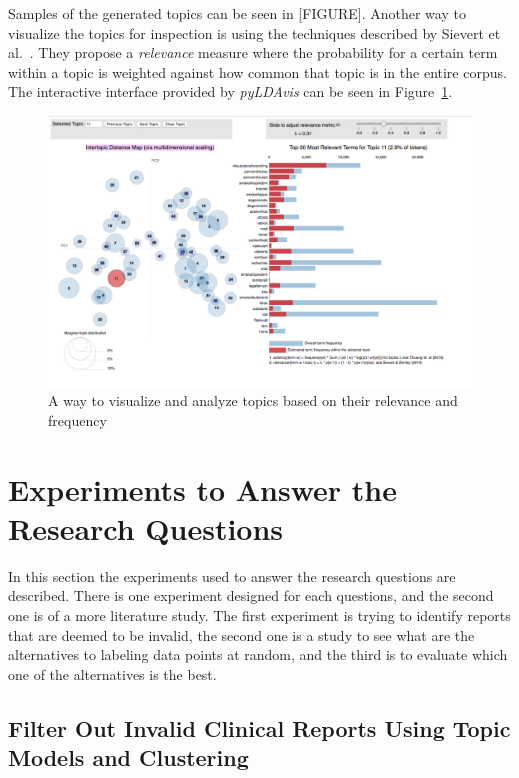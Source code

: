 Samples of the generated topics can be seen in [FIGURE].
Another way to visualize the topics for inspection is using the techniques described by Sievert et al\@.~\cite{sievert2014ldavis}.
They propose a \textit{relevance} measure where the probability for a certain term within a topic is weighted against how common that topic is in the entire corpus.
The interactive interface provided by \textit{pyLDAvis} can be seen in Figure~\ref{fig:ldavis-sample}.

\begin{figure}
    \centering
    \includegraphics[scale=0.3]{figures/ldavis-sample.png}
    \caption{A way to visualize and analyze topics based on their relevance and frequency}
    \label{fig:ldavis-sample}
\end{figure}

\section{Experiments to Answer the Research Questions}
In this section the experiments used to answer the research questions are described.
There is one experiment designed for each questions, and the second one is of a more literature study.
The first experiment is trying to identify reports that are deemed to be invalid, the second one is a study to see what are the alternatives to labeling data points at random, and the third is to evaluate which one of the alternatives is the best.

\subsection{Filter Out Invalid Clinical Reports Using Topic Models and Clustering}

